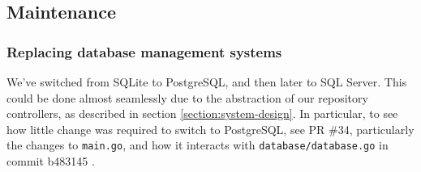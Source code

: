 \subsection{Maintenance}

\subsubsection{Replacing database management systems}

We've switched from SQLite to PostgreSQL, and then later to SQL Server. This could be done almost seamlessly due to the abstraction of our repository controllers, as described in section \ref{section:system-design}.
In particular, to see how little change was required to switch to PostgreSQL, see PR \#34, particularly the changes to \texttt{main.go}, and how it interacts with \texttt{database/database.go} in commit b483145 \cite{commit:switching-to-psql}.
